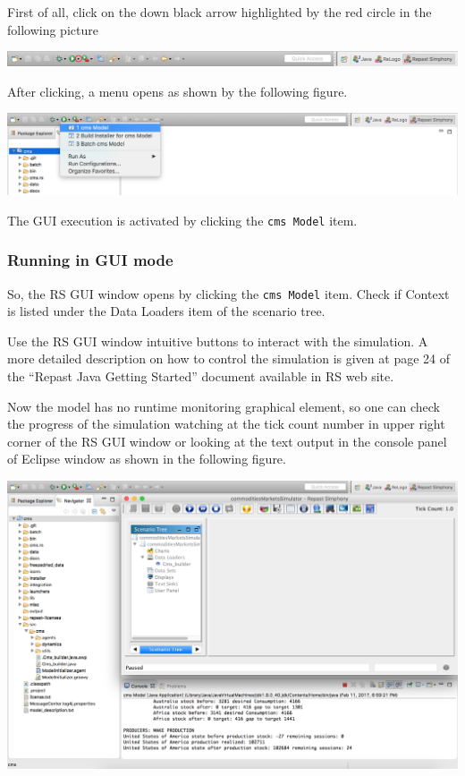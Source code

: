 \documentclass{article}
\begin{document}
First of all, click on the down black arrow highlighted by the red circle in the following picture

\vskip2mm
\noindent
\includegraphics[scale=0.35]{fig_cms_rs_execution1}

After clicking, a menu opens as shown by the following figure. 

\vskip2mm
\noindent
\includegraphics[scale=0.35]{fig_cms_rs_execution2}

\vskip2mm
The GUI execution is activated by clicking the \verb+cms Model+ item.


\subsubsection{Running in GUI mode}

So, the RS GUI window opens by clicking the \verb+cms Model+ item. Check if Context is listed under the Data Loaders item of the scenario tree.

Use the RS GUI window intuitive buttons to interact with the simulation. A more detailed description on how to control the simulation is given at page 24 of the ``Repast Java Getting Started'' document available in RS web site.

Now the model has no runtime monitoring graphical element, so one can check the progress of the simulation watching at the tick count number in upper right corner of the RS GUI window or looking at the text output in the console panel of Eclipse window as shown in the following figure. 

\vskip2mm
\noindent
\includegraphics[scale=0.35]{fig_cms_rs_gui7}
\end{document}
